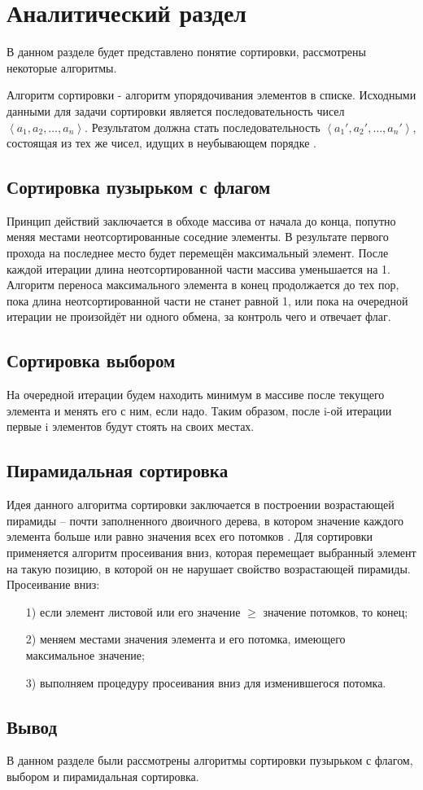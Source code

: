 \chapter{Аналитический раздел}
\label{cha:analysis}
В данном разделе будет представлено понятие сортировки, рассмотрены некоторые алгоритмы.

Алгоритм сортировки - алгоритм упорядочивания элементов в списке. Исходными данными для задачи сортировки является последовательность чисел $\left\langle a_1,a_2,\dots,a_n \right\rangle$. Результатом должна стать последовательность $\left\langle a_1',a_2',\dots,a_n' \right\rangle$, состоящая из тех же чисел, идущих в неубывающем порядке \cite{Cormen}. 

\section{Сортировка пузырьком с флагом}
Принцип действий заключается в обходе массива от начала до конца, попутно меняя местами неотсортированные соседние элементы. В результате первого прохода на последнее место будет перемещён максимальный элемент. После каждой итерации длина неотсортированной части массива уменьшается на 1. Алгоритм переноса максимального элемента в конец продолжается до тех пор, пока длина неотсортированной части не станет равной 1, или пока на очередной итерации не произойдёт ни одного обмена, за контроль чего и отвечает флаг.

\section{Сортировка выбором}
На очередной итерации будем находить минимум в массиве после текущего элемента и менять его с ним, если надо. Таким образом, после i-ой итерации первые i элементов будут стоять на своих местах.

\section{Пирамидальная сортировка}
Идея данного алгоритма сортировки заключается в построении возрастающей пирамиды -- почти заполненного двоичного дерева, в котором значение каждого элемента больше или равно значения всех его потомков \cite{archive}. Для сортировки применяется алгоритм просеивания вниз, которая перемещает выбранный элемент на такую позицию, в которой он не нарушает свойство возрастающей пирамиды. Просеивание вниз:
\begin{enumerate}
	\item[1)] если элемент листовой или его значение $\geq$ значение потомков, то конец;
	\item[2)] меняем местами значения элемента и его потомка, имеющего максимальное значение;
	\item[3)] выполняем процедуру просеивания вниз для изменившегося потомка. 
\end{enumerate}
\section{Вывод}
В данном разделе были рассмотрены алгоритмы сортировки пузырьком с флагом, выбором и пирамидальная сортировка.